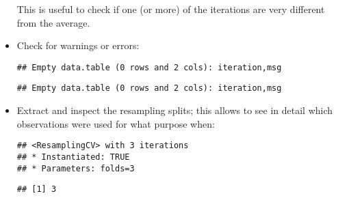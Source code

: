 \documentclass[
]{scrbook}
\newenvironment{Shaded}{\begin{snugshade}}{\end{snugshade}}
\newcommand{\DecValTok}[1]{\textcolor[rgb]{0.00,0.00,0.81}{#1}}
\newcommand{\FunctionTok}[1]{\textcolor[rgb]{0.00,0.00,0.00}{#1}}
\newcommand{\NormalTok}[1]{#1}
\newcommand{\SpecialCharTok}[1]{\textcolor[rgb]{0.00,0.00,0.00}{#1}}
\renewenvironment{Shaded} {\begin{snugshade}\small} {\end{snugshade}}
\begin{document}
\begin{itemize}
  This is useful to check if one (or more) of the iterations are very different from the average.
\item
  Check for warnings or errors:

\begin{Shaded}
\end{Shaded}

\begin{verbatim}
## Empty data.table (0 rows and 2 cols): iteration,msg
\end{verbatim}

\begin{Shaded}
\end{Shaded}

\begin{verbatim}
## Empty data.table (0 rows and 2 cols): iteration,msg
\end{verbatim}
\item
  Extract and inspect the resampling splits; this allows to see in detail which observations were used for what purpose when:

\begin{Shaded}
\end{Shaded}

\begin{verbatim}
## <ResamplingCV> with 3 iterations
## * Instantiated: TRUE
## * Parameters: folds=3
\end{verbatim}

\begin{Shaded}
\end{Shaded}

\begin{verbatim}
## [1] 3
\end{verbatim}

\begin{Shaded}
\end{Shaded}


\end{itemize}
\end{document}
